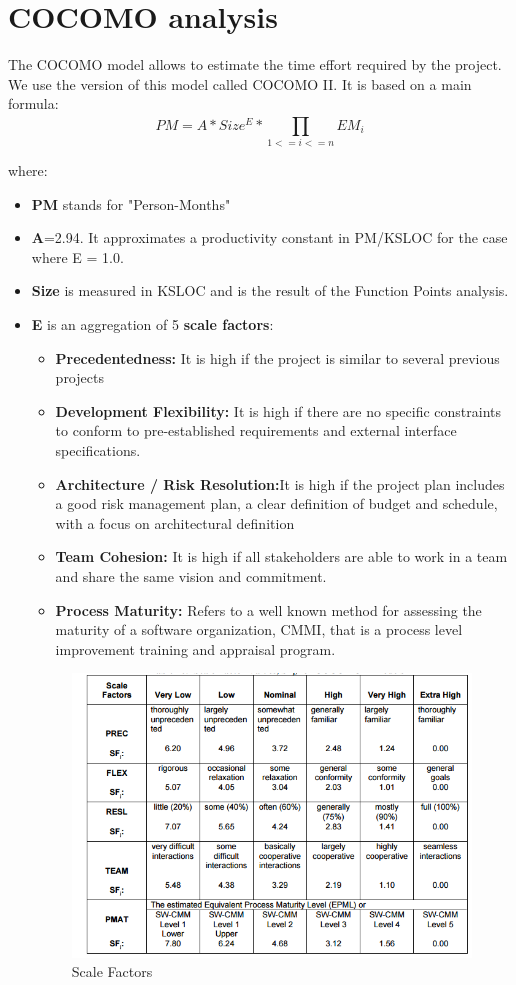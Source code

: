 \section{COCOMO analysis}
The COCOMO model allows to estimate the time effort required by the project. We use the version of this model called COCOMO II. It is based on a main formula:
\begin{equation}
PM = A * Size^{E} * \prod_{1<=i<=n}^{} EM_{i} 
\end{equation}

where:
\begin{itemize}
	\item \textbf{PM} stands for "Person-Months"
	\item \textbf{A}=2.94. It approximates a productivity constant in PM/KSLOC for the case where E = 1.0.
	\item \textbf{Size} is measured in KSLOC and is the result of the Function Points analysis.
	\item \textbf{E} is an aggregation of 5 \textbf{scale factors}:
	\begin{itemize}[label = {-}]
		\item \textbf{Precedentedness:} It is high if the project is similar to several previous projects
		\item \textbf{Development Flexibility:} It is high if there are no specific constraints to conform to pre-established     requirements and external interface specifications.
		\item \textbf{Architecture / Risk Resolution:}It is high if the project plan includes a good risk management plan, a clear definition of budget and schedule, with a focus on architectural definition
		\item \textbf{Team Cohesion:} It is high if all stakeholders are able to work in a team and share the same vision and commitment.
		\item \textbf{Process Maturity:} Refers to a well known method for assessing the maturity of a software organization, CMMI, that is a process level improvement training and appraisal program.
	\end{itemize}
	\begin{figure}[H] 
		\centering
		\includegraphics[scale = 0.7]{img/scaleFactors.png}
		\caption{Scale Factors}
	\end{figure}
	

\end{itemize}
